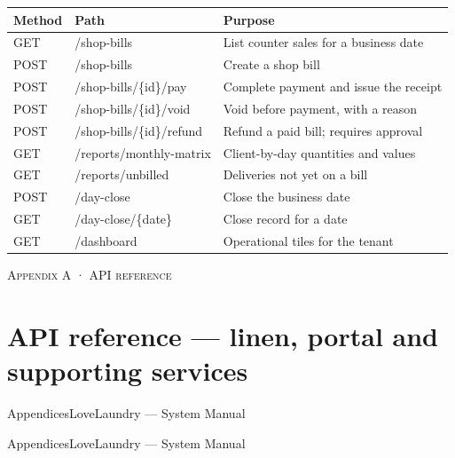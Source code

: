 \documentclass[11pt,a4paper,oneside]{book}
\begin{document}
\begin{center}\small
\begin{tabularx}{\linewidth}{|X|X|X|}
\hline
\rowcolor{lightgrey}
\textbf{Method} & \textbf{Path} & \textbf{Purpose} \\ \hline
GET & /shop-bills & List counter sales for a business date \\ \hline
POST & /shop-bills & Create a shop bill \\ \hline
POST & /shop-bills/\{id\}/pay & Complete payment and issue the receipt \\ \hline
POST & /shop-bills/\{id\}/void & Void before payment, with a reason \\ \hline
POST & /shop-bills/\{id\}/refund & Refund a paid bill; requires approval \\ \hline
GET & /reports/monthly-matrix & Client-by-day quantities and values \\ \hline
GET & /reports/unbilled & Deliveries not yet on a bill \\ \hline
POST & /day-close & Close the business date \\ \hline
GET & /day-close/\{date\} & Close record for a date \\ \hline
GET & /dashboard & Operational tiles for the tenant \\ \hline
\end{tabularx}
\end{center}
\textsc{\small\color{crimson}Appendix A · API reference}\par\medskip
\section*{API reference — linen, portal and supporting services}
AppendicesLoveLaundry — System Manual

AppendicesLoveLaundry — System Manual
\end{document}
